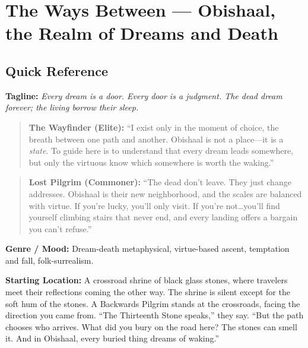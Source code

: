 \section{The Ways Between --- Obishaal, the Realm of Dreams and Death}
\label{chap:ways-between}

\subsection*{Quick Reference}

\textbf{Tagline:} \textit{Every dream is a door. Every door is a judgment. The dead dream forever; the living borrow their sleep.}

\begin{quote}
  \textbf{The Wayfinder (Elite):}  
  ``I exist only in the moment of choice, the breath between one path and another. Obishaal is not a place---it is a \emph{state}. To guide here is to understand that every dream leads somewhere, but only the virtuous know which somewhere is worth the waking.''
\end{quote}

\begin{quote}
  \textbf{Lost Pilgrim (Commoner):}  
  ``The dead don't leave. They just change addresses. Obishaal is their new neighborhood, and the scales are balanced with virtue. If you're lucky, you'll only visit. If you're not\dots you'll find yourself climbing stairs that never end, and every landing offers a bargain you can't refuse.''
\end{quote}

\noindent\textbf{Genre / Mood:} Dream-death metaphysical, virtue-based ascent, temptation and fall, folk-surrealism.

\noindent\textbf{Starting Location:} A crossroad shrine of black glass stones, where travelers meet their reflections coming the other way. The shrine is silent except for the soft hum of the stones. A Backwards Pilgrim stands at the crossroads, facing the direction you came from. ``The Thirteenth Stone speaks,'' they say. ``But the path chooses who arrives. What did you bury on the road here? The stones can smell it. And in Obishaal, every buried thing dreams of waking.''

